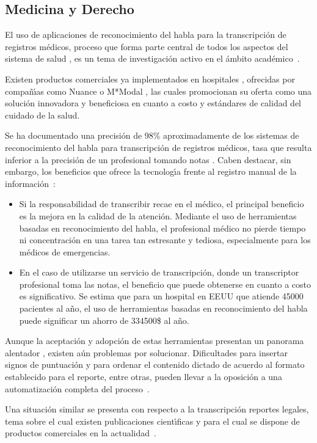 \subsection{Medicina y Derecho}
\label{sec:medicina}

El uso de aplicaciones de reconocimiento del habla para la transcripci\'on de registros m\'edicos, proceso que forma parte central
de todos los aspectos del sistema de salud \cite{DavidListening2009}, es un tema de investigaci\'on activo en el \'ambito 
\mbox{acad\'emico \cite{LaiMedSpeak1997, HappeCombining2002}}.

Existen productos comerciales ya implementados en hospitales \cite{USATodayHospitals}, ofrecidas por compa\~n{\'\i}as 
como Nuance \cite{NuanceOptimizing, NuanceSpeech} o M*Modal \cite{MmodalSpeech}, las cuales promocionan su oferta 
como una soluci\'on innovadora y beneficiosa en cuanto a costo y est\'andares de calidad del cuidado de la salud.

Se ha documentado una precisi\'on de 98\% aproximadamente de los sistemas de reconocimiento del habla para transcripci\'on de registros
m\'edicos, tasa que resulta inferior a la precisi\'on de un profesional tomando notas \cite{DavidListening2009}. 
Caben destacar, sin embargo, los beneficios que ofrece la tecnolog{\'\i}a frente al registro manual de 
la \mbox{informaci\'on \cite{ZickVoice2001}}:

\begin{itemize}
	\item Si la responsabilidad de transcribir recae en el m\'edico, el principal beneficio es la mejora en la calidad de la atenci\'on.
	Mediante el uso de herramientas basadas en reconocimiento del habla, el profesional m\'edico no pierde tiempo ni concentraci\'on en
	una tarea tan estresante y tediosa, especialmente para los m\'edicos de emergencias.
	\item En el caso de utilizarse un servicio de transcripci\'on, donde un transcriptor profesional toma las notas, el beneficio que
	puede obtenerse en cuanto a costo es significativo. Se estima que para un hospital en EEUU que atiende 45000 pacientes al a\~no,
	el uso de herramientas basadas en reconocimiento del habla puede significar un ahorro de 334500\$ al a\~no.
\end{itemize}

Aunque la aceptaci\'on y adopci\'on de estas herramientas presentan un panorama alentador \cite{GrassoLong2003}, 
existen a\'un problemas por solucionar. Dificultades para insertar signos de puntuaci\'on y para ordenar el contenido dictado
de acuerdo al formato establecido para el reporte, entre otras, pueden llevar a la oposici\'on a una automatizaci\'on 
completa del \mbox{proceso \cite{DavidListening2009}}.

Una situaci\'on similar se presenta con respecto a la transcripci\'on reportes legales, tema sobre el cual existen publicaciones
cient{\'\i}ficas \cite{van-leeuwen2008improving, FalavignaAutomatic2009} y para el cual se dispone de productos comerciales
en la \mbox{actualidad \cite{NuanceLegal}}.

